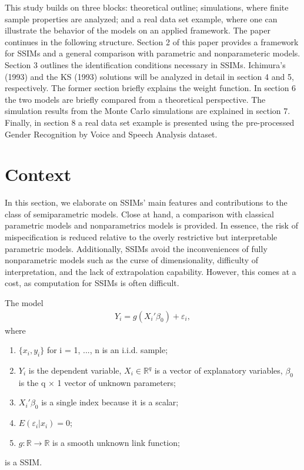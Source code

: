 \documentclass[a4paper]{article}
\begin{document}
This study builds on three blocks: theoretical outline; simulations, where finite sample properties are analyzed; and a real data set example, where one can illustrate the behavior of the models on an applied framework. 
The paper continues in the following structure. Section 2 of this paper provides a framework for SSIMs and a general comparison with parametric and nonparameteric models. Section 3 outlines the identification conditions necessary in SSIMs. Ichimura's (1993) \cite{[6]} and the KS (1993) \cite{[12]} solutions will be analyzed in detail in section 4 and 5, respectively. The former section briefly explains the weight function. In section 6 the two models are briefly compared from a theoretical perspective. The simulation results from the Monte Carlo simulations are explained in section 7. Finally, in section 8 a real data set example is presented using the pre-processed Gender Recognition by Voice and Speech Analysis dataset.

\section{Context} %
\label{sec:context}
In this section, we elaborate on SSIMs' main features and contributions to the class of semiparametric models. Close at hand, a comparison with classical parametric models and nonparametrics models is provided. In essence, the risk of mispecification is reduced relative to the overly restrictive but interpretable parametric models. Additionally, SSIMs avoid the inconveniences of fully nonparametric models such as the curse of dimensionality, difficulty of interpretation, and the lack of extrapolation capability. However, this comes at a cost, as computation for SSIMs is often difficult.

\vspace{2mm} 
The model
\begin{eqnarray}
Y_i = g(X_i'\beta_0) + \varepsilon_i,
\end{eqnarray}
where
\begin{enumerate}[label=(\roman*)]
		\item $\{x_i,y_i\}$ for i = 1, ..., n is an i.i.d. sample;
		\item $Y_{i}$ is the dependent variable, $X_i \in \mathbb{R}^{q}$ is a vector of explanatory variables, $\beta_0$ is the q $\times$ 1 vector of unknown parameters; 
	\item $X_i'\beta_0$ is a single index because it is a scalar;
	\item $ E(\varepsilon_i|x_i) = 0 $;
	\item $g: \mathbb{R} \rightarrow \mathbb{R} $ is a smooth unknown link function; 
\end{enumerate}
is a SSIM.
\vspace{2mm}
\end{document}
